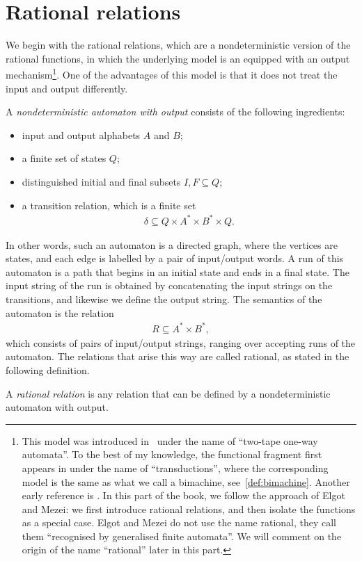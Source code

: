 \section{Rational relations}
\label{sec:rational-relations}

We  begin with the rational relations, which are a nondeterministic version of the rational functions, in which the underlying model is an \nfa equipped with an output mechanism\footnote{This model was introduced in~\cite[Definition 15]{RabinScott59} under the name of ``two-tape one-way automata''. To the best of my knowledge, the functional fragment first appears in \cite[Section II]{schutzenberger1961} under the name of ``transductions'', where the corresponding model is the same as what we call a bimachine, see~\cref{def:bimachine}.  Another early reference is 
\cite{elgotMezei1965}. In this part of the book, we follow the approach of Elgot and Mezei: we first introduce rational relations, and then isolate the functions as a special case. Elgot and Mezei do not use the name  rational, they call them ``recognised by generalised finite automata''. We will comment on the origin of the name ``rational'' later in this part. }. One of the advantages of this model is that it does not treat the input and output differently. 

\begin{definition}\label{def:nfa-with-output}
    A \emph{nondeterministic automaton with output} consists of the following ingredients:
    \begin{itemize}
        \item input and output alphabets $A$ and $B$;
        \item a finite set of states $Q$;
        \item distinguished initial and final subsets $I, F \subseteq Q$;
        \item a transition relation, which is a finite set 
        \begin{align*}
        \delta \subseteq Q \times A^* \times B^* \times Q. 
        \end{align*}
    \end{itemize}
\end{definition}

In other words, such an automaton is a directed graph, where the vertices are states, and each edge is labelled by a pair of input/output words. A run of this automaton is a path that begins in an initial state and ends in a final state. The input string of the run is obtained by concatenating the input strings on the transitions, and likewise we define the output string. The semantics of the automaton is the relation 
\begin{align*}
R \subseteq A^* \times B^*,
\end{align*}
which consists of pairs of input/output strings, ranging over accepting runs of the automaton. The relations that arise this way are called rational, as stated in the following definition. 
\begin{definition}
    \label{def:rational-relation}
    A \emph{rational relation} is any relation that can be defined by a nondeterministic automaton with output.
\end{definition}

